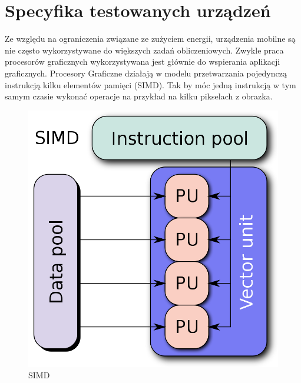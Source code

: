 \section[Specyfika testowanych urządzeń]{Specyfika testowanych urządzeń}
Ze względu na ograniczenia związane ze zużyciem energii, urządzenia mobilne są nie często wykorzystywane do większych zadań obliczeniowych. Zwykle praca procesorów graficznych wykorzystywana jest głównie do wspierania aplikacji graficznych. Procesory Graficzne działają w modelu przetwarzania pojedynczą instrukcją kilku elementów pamięci (SIMD). Tak by móc jedną instrukcją w tym samym czasie wykonać operacje na przykład na kilku pikselach z obrazka. 
\begin{figure}[H]
	\includegraphics[scale=0.16]{imgs/SIMD2.svg.png}
	\caption{SIMD \cite{SIMD}}
\end{figure}

